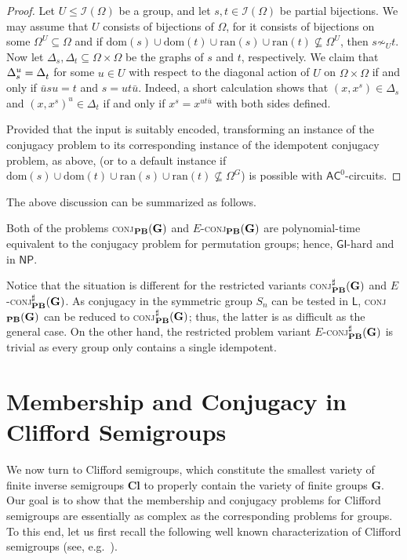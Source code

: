 \documentclass[anonymous,letter,UKenglish,cleveref,autoref,thm-restate]{lipics-v2021}
\renewcommand{\leq}{\leqslant}
\newcommand{\eg}{e.g.~}
\newcommand{\ACz}{\ensuremath{\mathsf{AC}^0}\xspace}
\newcommand{\LOGSPACE}{\ensuremath{\mathsf{L}}\xspace}
\newcommand{\NP}{\ensuremath{\mathsf{NP}}\xspace}
\newcommand{\GI}{\ensuremath{\mathsf{GI}}}
\renewcommand{\L}{\LOGSPACE}
\newcommand{\vG}{\ensuremath{\mathbf{G}}}
\newcommand{\vCl}{\ensuremath{\mathbf{Cl}}}
\newcommand{\ISym}{\cI}
\newcommand{\cI}{\mathcal{I}}
\theoremstyle{plain}
\theoremstyle{plain}
\newcommand{\dConj}[2][]{\textup{\textsc{conj${}_{\mathbf{#1}}\expandafter\ifx\expandafter\relax\detokenize{#2}\relax\else(#2)\fi$}}}
\newcommand{\dConjS}[2][]{\textup{\textsc{conj${}^{\sharp}_{\mathbf{#1}}\expandafter\ifx\expandafter\relax\detokenize{#2}\relax\else(#2)\fi$}}}
\newcommand{\dEConj}[2][]{\ensuremath{E}\textnormal{-}\dConj[#1]{#2}}
\newcommand{\dEConjS}[2][]{\ensuremath{E}\textnormal{-}\dConjS[#1]{#2}}
\begin{document}
\begin{proof}
	Let $U \leq \ISym(\Omega)$ be a group, and let $s,t \in \ISym(\Omega)$ be partial bijections.
	We may assume that $U$ consists of bijections of $\Omega$, for it consists of bijections on some $\Omega^U \subseteq \Omega$ and if $\mathrm{dom}(s) \cup \mathrm{dom}(t) \cup \mathrm{ran}(s) \cup \mathrm{ran}(t) \not\subseteq \Omega^U$, then $s \not\sim_U t$.
	Now let $\Delta_s, \Delta_t \subseteq \Omega\times\Omega$ be the graphs of $s$ and $t$, respectively.
	We claim that $\Delta^u_s = \Delta^{\mathstrut}_t$ for some $u \in U$ with respect to the diagonal action of $U$ on $\Omega \times \Omega$ if and only if $\bar u s u = t$ and $s = u t \bar u$.
	Indeed, a short calculation shows that $(x, x^s) \in \Delta_s$ and $(x, x^s)^u \in \Delta_t$ if and only if $x^s = x^{ut\bar u}$ with both sides defined.
	
	Provided that the input is suitably encoded, transforming an instance of the conjugacy problem to its corresponding instance of the idempotent conjugacy problem, as above, (or to a default instance if $\mathrm{dom}(s) \cup \mathrm{dom}(t) \cup \mathrm{ran}(s) \cup \mathrm{ran}(t) \not\subseteq \Omega^G$) is possible with $\ACz$-circuits.
\end{proof}

The above discussion can be summarized as follows.

\begin{proposition}\label{pro:bpm-groups-conjugacy}
  Both of the problems \dConj[PB]{\vG} and \dEConj[PB]{\vG} are polynomial-time equivalent to the conjugacy problem for permutation groups; hence, \GI-hard and in \NP{}.
\end{proposition}

Notice that the situation is different for the restricted variants \dConjS[PB]{\vG} and \dEConjS[PB]{\vG}.
As conjugacy in the symmetric group $S_n$ can be tested in \L, \dConj[PB]{\vG} can be reduced to \dConjS[PB]{\vG}; thus, the latter is as difficult as the general case.
On the other hand, the restricted problem variant \dEConjS[PB]{\vG} is trivial as every group only contains a single idempotent.



\section{Membership and Conjugacy in Clifford Semigroups}\label{sec:clifford}

We now turn to Clifford semigroups, which constitute the smallest variety of finite inverse semigroups $\vCl$ to properly contain the variety of finite groups $\vG$.
Our goal is to show that the membership and conjugacy problems for Clifford semigroups are essentially as complex as the corresponding problems for groups.
To this end, let us first recall the following well known characterization of Clifford semigroups (see, \eg \cite{Petrich84,Law99}).
\end{document}
